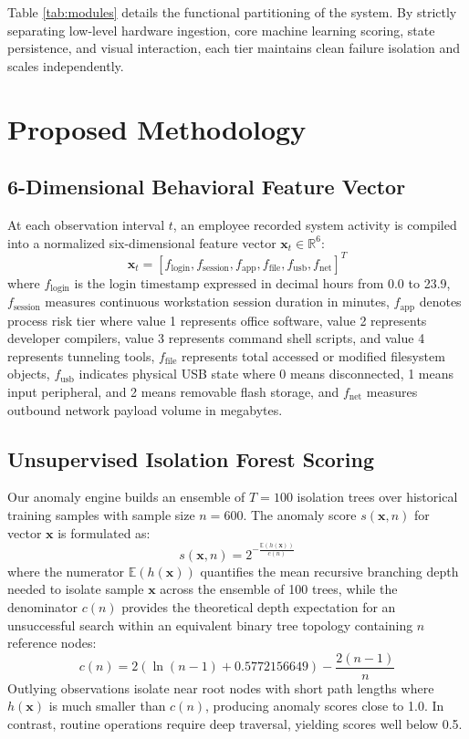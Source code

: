 \documentclass[conference]{IEEEtran}
\begin{document}
Table \ref{tab:modules} details the functional partitioning of the system. By strictly separating low-level hardware ingestion, core machine learning scoring, state persistence, and visual interaction, each tier maintains clean failure isolation and scales independently.

\section{Proposed Methodology}

\subsection{6-Dimensional Behavioral Feature Vector}
At each observation interval $t$, an employee recorded system activity is compiled into a normalized six-dimensional feature vector $\mathbf{x}_t \in \mathbb{R}^6$:
\begin{equation}
\mathbf{x}_t = [f_{\text{login}}, f_{\text{session}}, f_{\text{app}}, f_{\text{file}}, f_{\text{usb}}, f_{\text{net}}]^T
\label{eq:feature_vector}
\end{equation}
where $f_{\text{login}}$ is the login timestamp expressed in decimal hours from 0.0 to 23.9, $f_{\text{session}}$ measures continuous workstation session duration in minutes, $f_{\text{app}}$ denotes process risk tier where value 1 represents office software, value 2 represents developer compilers, value 3 represents command shell scripts, and value 4 represents tunneling tools, $f_{\text{file}}$ represents total accessed or modified filesystem objects, $f_{\text{usb}}$ indicates physical USB state where 0 means disconnected, 1 means input peripheral, and 2 means removable flash storage, and $f_{\text{net}}$ measures outbound network payload volume in megabytes.

\subsection{Unsupervised Isolation Forest Scoring}
Our anomaly engine builds an ensemble of $T = 100$ isolation trees over historical training samples with sample size $n = 600$. The anomaly score $s(\mathbf{x}, n)$ for vector $\mathbf{x}$ is formulated as:
\begin{equation}
s(\mathbf{x}, n) = 2^{-\frac{\mathbb{E}(h(\mathbf{x}))}{c(n)}}
\label{eq:iforest_score}
\end{equation}
where the numerator $\mathbb{E}(h(\mathbf{x}))$ quantifies the mean recursive branching depth needed to isolate sample $\mathbf{x}$ across the ensemble of 100 trees, while the denominator $c(n)$ provides the theoretical depth expectation for an unsuccessful search within an equivalent binary tree topology containing $n$ reference nodes:
\begin{equation}
c(n) = 2\left(\ln(n - 1) + 0.5772156649\right) - \frac{2(n - 1)}{n}
\label{eq:bst_depth}
\end{equation}
Outlying observations isolate near root nodes with short path lengths where $h(\mathbf{x})$ is much smaller than $c(n)$, producing anomaly scores close to 1.0. In contrast, routine operations require deep traversal, yielding scores well below 0.5.
\end{document}
